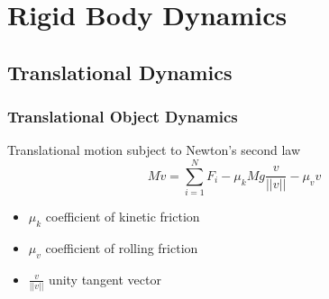 \documentclass{beamer}
\begin{document}
\section{Rigid Body Dynamics}
\subsection{Translational Dynamics}
\begin{frame}
\frametitle{Translational Object Dynamics}
Translational motion subject to Newton's second law
\begin{equation}
M\dot{v}=\sum_{i=1}^N F_i-\mu_{k}Mg\frac{v}{||v||}-\mu_v v
\end{equation}
\begin{itemize}
\item $\mu_k$ coefficient of kinetic friction  \vspace{0.2cm}
\item $\mu_v$ coefficient of rolling friction  \vspace{0.2cm}
\item $\frac{v}{||v||}$ unity tangent vector
\end{itemize}
\end{frame}
\end{document}
